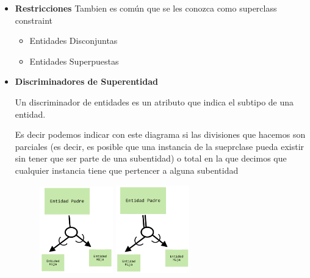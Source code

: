 \documentclass[12pt, fleqn]{report}                             %
\begin{document}
\begin{itemize}
            \item
                \textbf{Restricciones}
                    Tambien es común que se les conozca como superclass constraint

                    \begin{itemize}
                        \item Entidades Disconjuntas
                        \item Entidades Superpuestas
                    \end{itemize}

            \item
                \textbf{Discriminadores de Superentidad}

                Un discriminador de entidades es un atributo que indica el subtipo
                de una entidad.

                Es decir podemos indicar con este diagrama si las divisiones que hacemos
                son parciales (es decir, es posible que una instancia de la sueprclase
                pueda existir sin tener que ser parte de una subentidad) o total
                en la que decimos que cualquier instancia tiene que pertencer a alguna
                subentidad

                \begin{figure}[h]
                    \centering
                    \includegraphics[width=0.30\textwidth]{EERD0}
                    \includegraphics[width=0.30\textwidth]{EERD1}
                \end{figure}

        \end{itemize}
\end{document}
